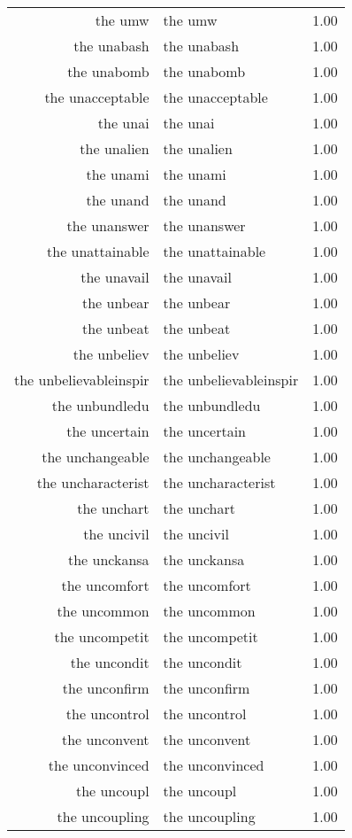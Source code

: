 \begin{table}[ht]
\begin{tabular}{rlr}
  the umw & the umw & 1.00 \\ 
  the unabash & the unabash & 1.00 \\ 
  the unabomb & the unabomb & 1.00 \\ 
  the unacceptable & the unacceptable & 1.00 \\ 
  the unai & the unai & 1.00 \\ 
  the unalien & the unalien & 1.00 \\ 
  the unami & the unami & 1.00 \\ 
  the unand & the unand & 1.00 \\ 
  the unanswer & the unanswer & 1.00 \\ 
  the unattainable & the unattainable & 1.00 \\ 
  the unavail & the unavail & 1.00 \\ 
  the unbear & the unbear & 1.00 \\ 
  the unbeat & the unbeat & 1.00 \\ 
  the unbeliev & the unbeliev & 1.00 \\ 
  the unbelievableinspir & the unbelievableinspir & 1.00 \\ 
  the unbundledu & the unbundledu & 1.00 \\ 
  the uncertain & the uncertain & 1.00 \\ 
  the unchangeable & the unchangeable & 1.00 \\ 
  the uncharacterist & the uncharacterist & 1.00 \\ 
  the unchart & the unchart & 1.00 \\ 
  the uncivil & the uncivil & 1.00 \\ 
  the unckansa & the unckansa & 1.00 \\ 
  the uncomfort & the uncomfort & 1.00 \\ 
  the uncommon & the uncommon & 1.00 \\ 
  the uncompetit & the uncompetit & 1.00 \\ 
  the uncondit & the uncondit & 1.00 \\ 
  the unconfirm & the unconfirm & 1.00 \\ 
  the uncontrol & the uncontrol & 1.00 \\ 
  the unconvent & the unconvent & 1.00 \\ 
  the unconvinced & the unconvinced & 1.00 \\ 
  the uncoupl & the uncoupl & 1.00 \\ 
  the uncoupling & the uncoupling & 1.00 \\ 

\end{tabular}
\end{table}
